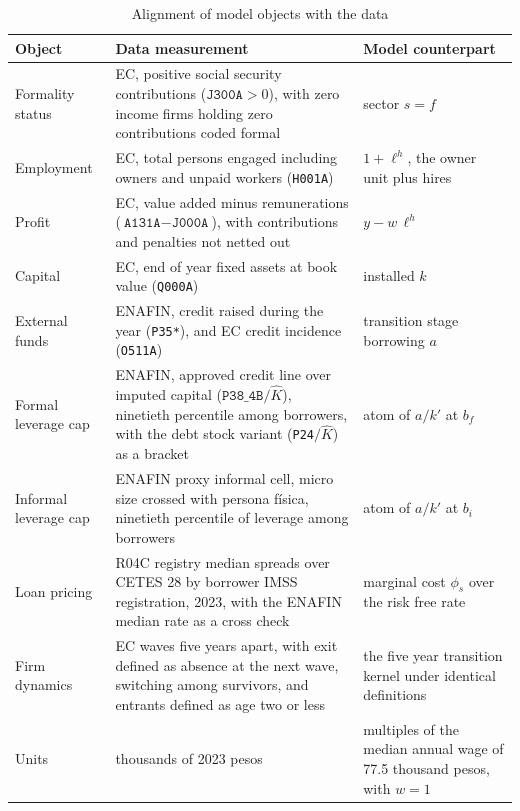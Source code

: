 \documentclass[12pt]{article}
\begin{document}
\begin{table}[t]
\centering\small
\caption{Alignment of model objects with the data}
\label{tab:app-measurement}
\begin{tabular}{p{}p{}p{}}
\toprule
Object & Data measurement & Model counterpart \\
\midrule
Formality status & EC, positive social security contributions ($\texttt{J300A}>0$), with zero income firms holding zero contributions coded formal & sector $s=f$ \\
Employment & EC, total persons engaged including owners and unpaid workers (\texttt{H001A}) & $1+\ell^{h}$, the owner unit plus hires \\
Profit & EC, value added minus remunerations ($\texttt{A131A}-\texttt{J000A}$), with contributions and penalties not netted out & $y-w\,\ell^{h}$ \\
Capital & EC, end of year fixed assets at book value (\texttt{Q000A}) & installed $k$ \\
External funds & ENAFIN, credit raised during the year (\texttt{P35*}), and EC credit incidence (\texttt{O511A}) & transition stage borrowing $a$ \\
Formal leverage cap & ENAFIN, approved credit line over imputed capital ($\texttt{P38\_4B}/\hat K$), ninetieth percentile among borrowers, with the debt stock variant (\texttt{P24}$/\hat K$) as a bracket & atom of $a/k'$ at $b_{f}$ \\
Informal leverage cap & ENAFIN proxy informal cell, micro size crossed with persona f\'isica, ninetieth percentile of leverage among borrowers & atom of $a/k'$ at $b_{i}$ \\
Loan pricing & R04C registry median spreads over CETES 28 by borrower IMSS registration, 2023, with the ENAFIN median rate as a cross check & marginal cost $\phi_{s}$ over the risk free rate \\
Firm dynamics & EC waves five years apart, with exit defined as absence at the next wave, switching among survivors, and entrants defined as age two or less & the five year transition kernel under identical definitions \\
Units & thousands of 2023 pesos & multiples of the median annual wage of 77.5 thousand pesos, with $w=1$ \\
\bottomrule
\end{tabular}
\end{table}
\end{document}
